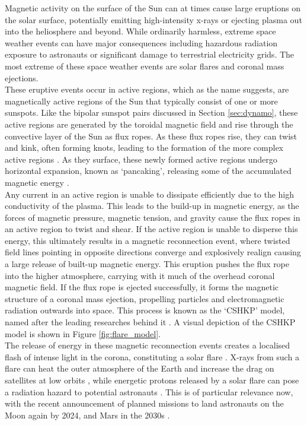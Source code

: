 \documentclass[11pt,a4paper,onecolumn]{report}
\begin{document}
Magnetic activity on the surface of the Sun can at times cause large eruptions
on the solar surface, potentially emitting high-intensity x-rays or ejecting
plasma out into the heliosphere and beyond. While ordinarily harmless, extreme
space weather events can have major consequences including hazardous radiation exposure
to astronauts or significant damage to terrestrial electricity grids. The most extreme
of these space weather events are solar flares and coronal mass ejections. \\


These eruptive events occur in active regions, which as the name
suggests, are magnetically active regions of the Sun that typically consist of
one or more sunspots. Like the bipolar sunspot pairs discussed in Section
\ref{sec:dynamo}, these active regions are generated by the toroidal magnetic
field and rise through the convective layer of the Sun as flux ropes. As these
flux ropes rise, they can twist and kink, often forming knots, leading to the
formation of the more complex active regions \citep{linton_helical_1996}. As they surface,
these newly formed active regions undergo horizontal expansion, known as `pancaking',
releasing some of the accumulated magnetic energy
\citep{toriumi_flare-productive_2019}.\\

Any current in an active region is unable to dissipate efficiently due to
the high conductivity of the plasma. This leads to the build-up in magnetic energy, as the
forces of magnetic pressure, magnetic tension, and gravity cause the flux ropes
in an active region to twist and shear. If the active region is unable to disperse this energy, this
ultimately results in a magnetic reconnection event, where twisted field lines
pointing in opposite directions converge and explosively realign causing a large
release of built-up magnetic energy. This eruption
pushes the flux rope into the higher atmosphere, carrying with it much of the
overhead coronal magnetic field. If the flux rope is ejected successfully, it
forms the magnetic structure of a coronal mass ejection, propelling particles and electromagnetic
radiation outwards into space. This process is known as the `CSHKP' model, named after
the leading researches behind it \citep{carmichael_process_1964,
sturrock_model_1966, hirayama_theoretical_1974, kopp_magnetic_1976}. A visual
depiction of the CSHKP model is shown in Figure \ref{fig:flare_model}. \\


The release of energy in these magnetic reconnection events creates a localised
flash of intense light in the corona, constituting a solar flare
\citep{priest_solar_1984}. X-rays from such a flare can heat the outer
atmosphere of the Earth and increase the drag on satellites at low orbits
\citep{Oliveira2019}, while energetic protons released by a solar flare can pose
a radiation hazard to potential astronauts \citep{lamarche1996, Mewaldt2005}.
This is of particular relevance now, with the recent announcement of planned
missions to land astronauts on the Moon again by 2024, and Mars in the 2030s
\citep{smith_artemis_2020}. \\
\end{document}

